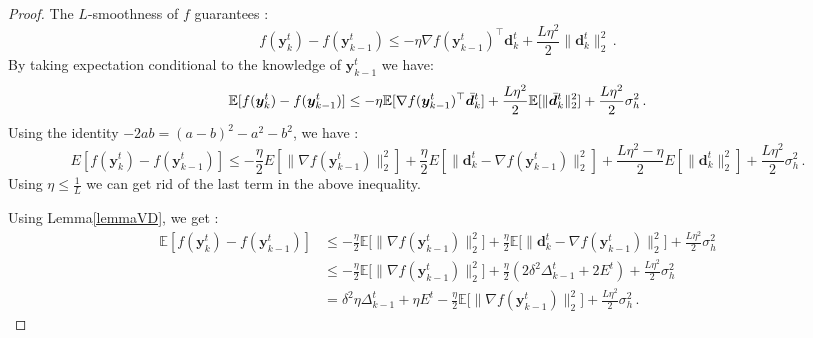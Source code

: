 \documentclass[10pt,a4paper]{amsart}
\newcommand{\E}{\mathbb{E}}
\newcommand{\norm}[1]{\|#1\|_2}
\def\vd{{\bm{d}}}
\def\vy{{\bm{y}}}
\begin{document}
\begin{proof}
The $L$-smoothness of $f$ guarantees :
$$f(\vy^t_k) - f(\vy^t_{k-1}) \leq - \eta\nabla f(\vy^t_{k-1})^\top \vd^t_k + \frac{L\eta^2}{2}\norm{\vd^t_k}^2\, .$$
By taking expectation conditional to the knowledge of $\vy^t_{k-1}$ we have:
$$\E[f(\vy^t_k) - f(\vy^t_{k-1})] \leq - \eta\E[\nabla f(\vy^t_{k-1})^\top \Bar{\vd}^t_k] + \frac{L\eta^2}{2}\E[\norm{\Bar{\vd}^t_k}^2] + \frac{L\eta^2}{2}\sigma_h^2\, .$$
Using the identity $-2ab = (a - b)^2 - a^2 - b^2$, we have : $$E[f(\vy^t_k) - f(\vy^t_{k-1})] \leq - \frac{\eta}{2} E[\norm{\nabla f(\vy^t_{k-1})}^2] + \frac{\eta}{2} E[\norm{\vd^t_k - \nabla f(\vy^t_{k-1})}^2] + \frac{L\eta^2 - \eta}{2}E[\norm{\vd^t_k}^2] + \frac{L\eta^2}{2}\sigma_h^2\, . $$
Using $\eta\leq \frac{1}{L}$ we can get rid of the last term in the above inequality.

Using Lemma\ref{lemmaVD}, we get : 
\begin{align*}
    \E[f(\vy^t_k) - f(\vy^t_{k-1})] &\leq - \frac{\eta}{2} \E\big[\norm{\nabla f(\vy^t_{k-1})}^2\big] + \frac{\eta}{2} \E\big[\norm{\vd^t_k - \nabla f(\vy^t_{k-1})}^2\big] + \frac{L\eta^2}{2}\sigma_h^2\\
    &\leq - \frac{\eta}{2} \E\big[\norm{\nabla f(\vy^t_{k-1})}^2\big] + \frac{\eta}{2}(2\delta^2 \Delta^t_{k-1} + 2 E^t) + \frac{L\eta^2}{2}\sigma_h^2\\
    &= \delta^2 \eta \Delta^t_{k-1} + \eta E^t - \frac{\eta}{2} \E\big[\norm{\nabla f(\vy^t_{k-1})}^2\big] + \frac{L\eta^2}{2}\sigma_h^2\, .
\end{align*}


\end{proof}
\end{document}
